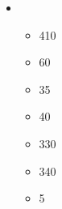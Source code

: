\begin{multicols}{2}
\begin{itemize}
	\item \instrumentsofdestruction
	\begin{itemize}
\item \infernalengine{} \basecost{} 410 
\item \infernalengine{} \rockcrusher{} 60 
\item \infernalengine{} \naphthathrower{} 35 
\item \infernalengine{} \rocketbattery{} 40 
\item \infernalbastion{} \basecost{} 330 
\item \citizengiant{} \basecost{} 340 
\item \citizengiant{} \giantclub{} 5 
	\end{itemize}
\end{itemize}
\end{multicols}
